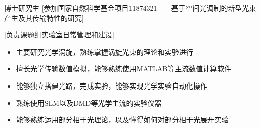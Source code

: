\documentclass[zh]{resume}
\begin{document}
\begin{experiences}
    {博士研究生}%
    [参加国家自然科学基金项目11874321——基于空间光调制的新型光束产生及其传输特性的研究] 
\end{experiences}
\begin{experiences}
  [负责课题组实验室日常管理和建设]
\end{experiences}
\begin{itemize}
  \item 主要研究光学涡旋，熟练掌握涡旋光束的理论和实验进行
  \item 擅长光学传输数值模拟，能够熟练使用MATLAB等主流数值计算软件
  \item 能够独立搭建光路，完成实验，能够实现光学实验自动化操作
  \item 熟练使用SLM以及DMD等光学主流的实验仪器
  \item 能够熟练运用部分相干光理论，以及懂得如何对部分相干光展开实验
\end{itemize}
\begin{competences}
\end{competences}
\end{document}
